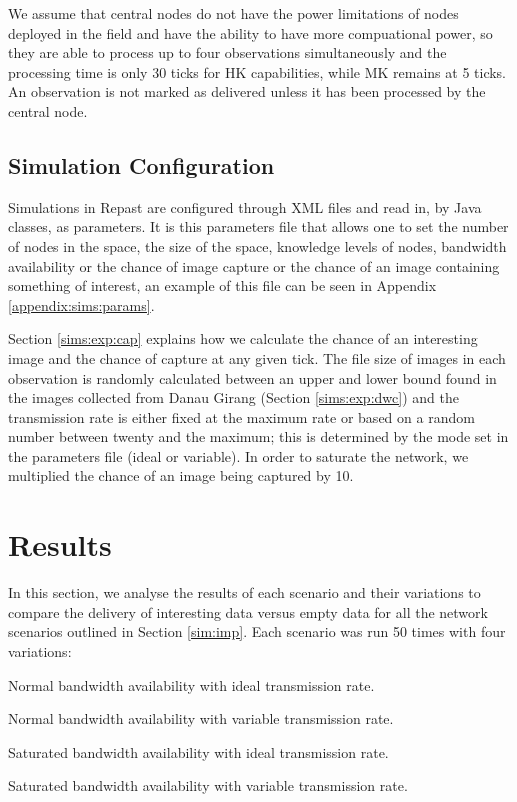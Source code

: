	We assume that central nodes do not have the power limitations of nodes deployed in the field and have the ability to have more compuational power, so they are able to process up to four observations simultaneously and the processing time is only 30 ticks for HK capabilities, while MK remains at 5 ticks. An observation is not marked as delivered unless it has been processed by the central node.

\subsection{Simulation Configuration}
	Simulations in Repast are configured through XML files and read in, by Java classes, as parameters. It is this parameters file that allows one to set the number of nodes in the space, the size of the space, knowledge levels of nodes, bandwidth availability or the chance of image capture or the chance of an image containing something of interest, an example of this file can be seen in Appendix \ref{appendix:sims:params}.

	Section \ref{sims:exp:cap} explains how we calculate the chance of an interesting image and the chance of capture at any given tick. The file size of images in each observation is randomly calculated between an upper and lower bound found in the images collected from Danau Girang (Section \ref{sims:exp:dwc}) and the transmission rate is either fixed at the maximum rate or based on a random number between twenty and the maximum; this is determined by the mode set in the parameters file (ideal or variable). In order to saturate the network, we multiplied the chance of an image being captured by 10.


	

\section{Results}\label{sim:res}

In this section, we analyse the results of each scenario and their variations to compare the delivery of interesting data versus empty data for all the network scenarios outlined in Section \ref{sim:imp}. Each scenario was run 50 times with four variations:
\begin{description}
	\item Normal bandwidth availability with ideal transmission rate.
	\item Normal bandwidth availability with variable transmission rate.
	\item Saturated bandwidth availability with ideal transmission rate.
	\item Saturated bandwidth availability with variable transmission rate.
\end{description}

